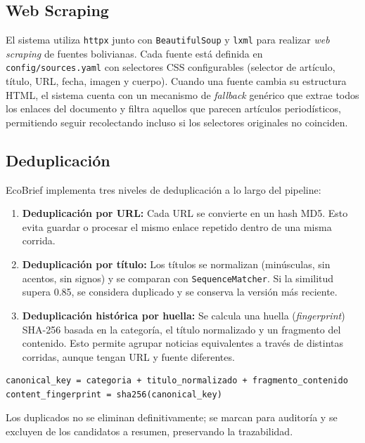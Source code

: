 \subsection{Web Scraping}

El sistema utiliza \texttt{httpx} junto con \texttt{BeautifulSoup} y \texttt{lxml} para realizar \textit{web scraping} de fuentes bolivianas. Cada fuente est\'a definida en \texttt{config/sources.yaml} con selectores CSS configurables (selector de art\'iculo, t\'itulo, URL, fecha, imagen y cuerpo). Cuando una fuente cambia su estructura HTML, el sistema cuenta con un mecanismo de \textit{fallback} gen\'erico que extrae todos los enlaces del documento y filtra aquellos que parecen art\'iculos period\'isticos, permitiendo seguir recolectando incluso si los selectores originales no coinciden.

\subsection{Deduplicaci\'on}

EcoBrief implementa tres niveles de deduplicaci\'on a lo largo del pipeline:

\begin{enumerate}[nosep]
    \item \textbf{Deduplicaci\'on por URL:} Cada URL se convierte en un hash MD5. Esto evita guardar o procesar el mismo enlace repetido dentro de una misma corrida.
    \item \textbf{Deduplicaci\'on por t\'itulo:} Los t\'itulos se normalizan (min\'usculas, sin acentos, sin signos) y se comparan con \texttt{SequenceMatcher}. Si la similitud supera 0.85, se considera duplicado y se conserva la versi\'on m\'as reciente.
    \item \textbf{Deduplicaci\'on hist\'orica por huella:} Se calcula una huella (\textit{fingerprint}) SHA-256 basada en la categor\'ia, el t\'itulo normalizado y un fragmento del contenido. Esto permite agrupar noticias equivalentes a trav\'es de distintas corridas, aunque tengan URL y fuente diferentes.
\end{enumerate}

\begin{lstlisting}[caption=Algoritmo de huella de contenido]
canonical_key = categoria + titulo_normalizado + fragmento_contenido
content_fingerprint = sha256(canonical_key)
\end{lstlisting}

Los duplicados no se eliminan definitivamente; se marcan para auditor\'ia y se excluyen de los candidatos a resumen, preservando la trazabilidad.

